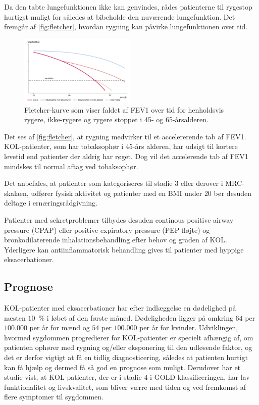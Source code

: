 Da den tabte lungefunktionen ikke kan genvindes, rådes patienterne til rygestop hurtigst muligt for således at bibeholde den nuværende lungefunktion. Det fremgår af \autoref{fig:fletcher}, hvordan rygning kan påvirke lungefunktionen over tid. 

\begin{figure} [H]
\centering
\includegraphics[width=0.5\textwidth]{figures/fletcher}
\caption{Fletcher-kurve som viser faldet af FEV1 over tid for henholdsvis rygere, ikke-rygere og rygere stoppet i 45- og 65-årsalderen.\cite{dsam2016}}
\label{fig:fletcher}
\end{figure} 

\noindent
Det ses af \autoref{fig:fletcher}, at rygning medvirker til et accelererende tab af FEV1. KOL-patienter, som har tobaksophør i 45-års alderen, har udsigt til kortere levetid end patienter der aldrig har røget. Dog vil det accelerende tab af FEV1 mindskes til normal aftag ved tobaksophør.\cite{dsam2016}

Det anbefales, at patienter som kategoriseres til stadie $3$ eller derover i MRC-skalaen, udfører fysisk aktivitet og patienter med en BMI under $ 20$ bør desuden deltage i ernæringsrådgivning. 

Patienter med sekretproblemer tilbydes desuden continous positive airway pressure (CPAP) eller positive expiratory pressure (PEP-fløjte) og bronkodilaterende inhalationsbehandling efter behov og graden af KOL. Yderligere kan antiinflammatorisk behandling gives til patienter med hyppige eksacerbationer. \cite{Basisbogen2016}
 
 
\subsection{Prognose}
KOL-patienter med eksacerbationer har efter indlæggelse en dødelighed på næsten $10$~$\%$ i løbet af den første måned. Dødeligheden ligger på omkring $64$ per $100.000$ per år for mænd og $54$ per $100.000$ per år for kvinder.
Udviklingen, hvormed sygdommen progredierer for KOL-patienter er specielt afhængig af, om patienten ophører med rygning og/eller eksponering til den udløsende faktor, og det er derfor vigtigt at få en tidlig diagnosticering, således at patienten hurtigt kan få hjælp og dermed få så god en prognose som muligt. \cite{dsam2016}
Derudover har et studie vist, at KOL-patienter, der er i stadie $4$ i GOLD-klassificeringen, har lav funktionalitet og livskvalitet, som bliver værre med tiden og ved fremkomst af flere symptomer til sygdommen. \cite{Habraken2011}


